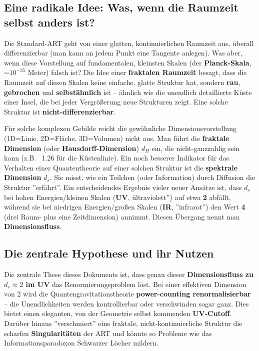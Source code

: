 	\subsection{Eine radikale Idee: Was, wenn die Raumzeit selbst anders ist?}
	Die Standard-ART geht von einer glatten, kontinuierlichen Raumzeit aus, überall differenzierbar (man kann an jedem Punkt eine Tangente anlegen). Was aber, wenn diese Vorstellung auf fundamentalen, kleinsten Skalen (der \textbf{Planck-Skala}, $\sim 10^{-35}$ Meter) falsch ist? Die Idee einer \textbf{fraktalen Raumzeit} besagt, dass die Raumzeit auf diesen Skalen keine einfache, glatte Struktur hat, sondern \textbf{rau}, \textbf{gebrochen} und \textbf{selbstähnlich} ist – ähnlich wie die unendlich detaillierte Küste einer Insel, die bei jeder Vergrößerung neue Strukturen zeigt. Eine solche Struktur ist \textbf{nicht-differenzierbar}.
	
	Für solche komplexen Gebilde reicht die gewöhnliche Dimensionsvorstellung (1D=Linie, 2D=Fläche, 3D=Volumen) nicht aus. Man führt die \textbf{fraktale Dimension} (oder \textbf{Hausdorff-Dimension}) $d_H$ ein, die nicht-ganzzahlig sein kann (z.B. ~1.26 für die Küstenlinie). Ein noch besserer Indikator für das Verhalten einer Quantentheorie auf einer solchen Struktur ist die \textbf{spektrale Dimension} $d_s$. Sie misst, wie ein Teilchen (oder Information) durch Diffusion die Struktur ''erfährt''. Ein entscheidendes Ergebnis vieler neuer Ansätze ist, dass $d_s$ bei hohen Energien/kleinen Skalen (\textbf{UV}, ültraviolett'') auf etwa \textbf{2} abfällt, während sie bei niedrigen Energien/großen Skalen (\textbf{IR}, ''infrarot'') den Wert \textbf{4} (drei Raum- plus eine Zeitdimension) annimmt. Diesen Übergang nennt man \textbf{Dimensionsfluss}.
	
	\subsection{Die zentrale Hypothese und ihr Nutzen}
	Die zentrale These dieses Dokuments ist, dass genau dieser \textbf{Dimensionsfluss zu $d_s \approx 2$ im UV} das Renormierungsproblem löst. Bei einer effektiven Dimension von 2 wird die Quantengravitationstheorie \textbf{power-counting renormalisierbar} – die Unendlichkeiten werden kontrollierbar oder verschwinden sogar ganz. Dies bietet einen eleganten, von der Geometrie selbst kommenden \textbf{UV-Cutoff}. Darüber hinaus ''verschmiert'' eine fraktale, nicht-kontinuierliche Struktur die scharfen \textbf{Singularitäten} der ART und könnte so Probleme wie das Informationsparadoxon Schwarzer Löcher mildern.
	
